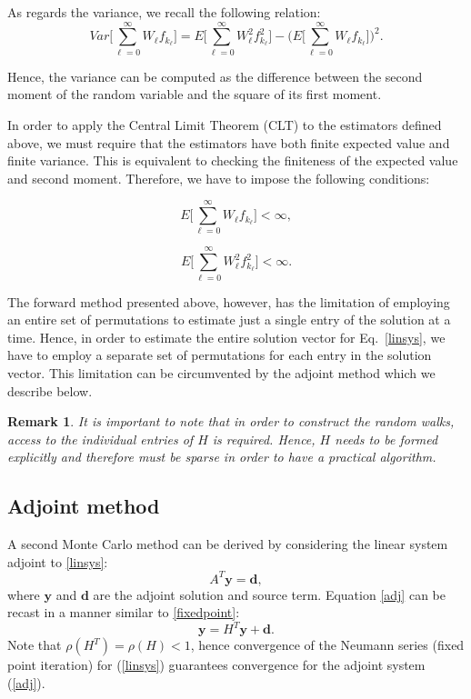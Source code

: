 \documentclass[final,leqno,onefignum,onetabnum]{siamltex1213}
\newtheorem{rem}{Remark}
\begin{document}
As regards the variance, we recall the following relation:
\begin{equation}
Var\bigg [\sum_{\ell=0}^\infty W_{\ell}
f_{k_{\ell}}\bigg]=E\bigg[\sum_{\ell=0}^\infty W_{\ell}^2
f_{k_{\ell}}^2\bigg] - \bigg (E\bigg[\sum_{\ell=0}^\infty W_{\ell}
f_{k_{\ell}}\bigg]\bigg )^2.
\label{dir_var}
\end{equation}

Hence, the variance can be computed as the difference between the second
moment of the random variable and the square of its first moment.\newline

In order to apply the Central Limit Theorem (CLT) to the estimators defined
above, we must require that
the estimators have both finite expected value and finite variance. This is
equivalent to
checking the finiteness of the expected value and second moment.
Therefore, we have to impose the following conditions:

\begin{equation}
 E\bigg[\sum_{\ell=0}^\infty W_{\ell} f_{k_{\ell}}\bigg]<\infty,
\end{equation}

\begin{equation}
 E\bigg[\sum_{\ell=0}^\infty W_{\ell}^2
f_{k_{\ell}}^2\bigg]<\infty .
\end{equation}

The forward method presented above, however, has the limitation of employing an
entire set of permutations to estimate just a single entry of
the solution at a time. Hence, in order to estimate the entire solution
vector for Eq.~\eqref{linsys}, we have to employ a separate set of
permutations for each entry in the solution vector. This limitation
can be circumvented by the adjoint method which we describe below.

\begin{rem}
It is important to note that in order to construct the random walks,
access to the individual entries of $H$ is required. Hence, $H$ needs to be formed explicitly
and therefore must be sparse in order to have a practical algorithm.
\end{rem}

\subsection{Adjoint method}
\label{subsec:adjoint}

A second Monte Carlo method can be derived by considering the linear system
adjoint to \eqref{linsys}:
\begin{equation}
A^T\mathbf{y}=\mathbf{d},
\label{adj}
\end{equation}
where $\mathbf{y}$ and $\mathbf{d}$ are the adjoint solution and source term.
Equation \eqref{adj} can be recast in a manner similar to \eqref{fixedpoint}:
\[
\mathbf{y} = H^T \mathbf{y} + \mathbf{d}.
\]
Note that $\rho(H^T) = \rho(H) <1$, hence convergence of the Neumann series
(fixed point iteration) for (\ref{linsys}) guarantees convergence
for the adjoint system (\ref{adj}).
\end{document}
